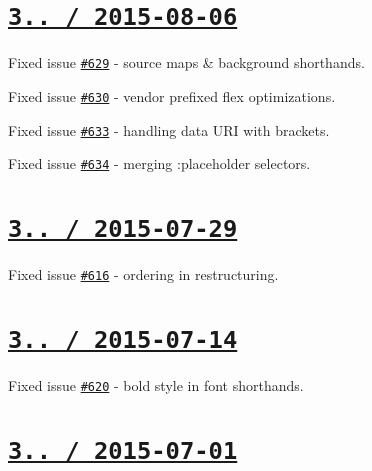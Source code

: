 \section*{\href{https://github.com/jakubpawlowicz/clean-css/compare/v3.3.7...v3.3.8}{\tt 3.. / 2015-\/08-\/06} }


\begin{DoxyItemize}
\item Fixed issue \href{https://github.com/jakubpawlowicz/clean-css/issues/629}{\tt \#629} -\/ source maps \& background shorthands.
\item Fixed issue \href{https://github.com/jakubpawlowicz/clean-css/issues/630}{\tt \#630} -\/ vendor prefixed flex optimizations.
\item Fixed issue \href{https://github.com/jakubpawlowicz/clean-css/issues/633}{\tt \#633} -\/ handling data U\+RI with brackets.
\item Fixed issue \href{https://github.com/jakubpawlowicz/clean-css/issues/634}{\tt \#634} -\/ merging \+:placeholder selectors.
\end{DoxyItemize}

\section*{\href{https://github.com/jakubpawlowicz/clean-css/compare/v3.3.6...v3.3.7}{\tt 3.. / 2015-\/07-\/29} }


\begin{DoxyItemize}
\item Fixed issue \href{https://github.com/jakubpawlowicz/clean-css/issues/616}{\tt \#616} -\/ ordering in restructuring.
\end{DoxyItemize}

\section*{\href{https://github.com/jakubpawlowicz/clean-css/compare/v3.3.5...v3.3.6}{\tt 3.. / 2015-\/07-\/14} }


\begin{DoxyItemize}
\item Fixed issue \href{https://github.com/jakubpawlowicz/clean-css/issues/620}{\tt \#620} -\/ {\ttfamily bold} style in font shorthands.
\end{DoxyItemize}

\section*{\href{https://github.com/jakubpawlowicz/clean-css/compare/v3.3.4...v3.3.5}{\tt 3.. / 2015-\/07-\/01} }


